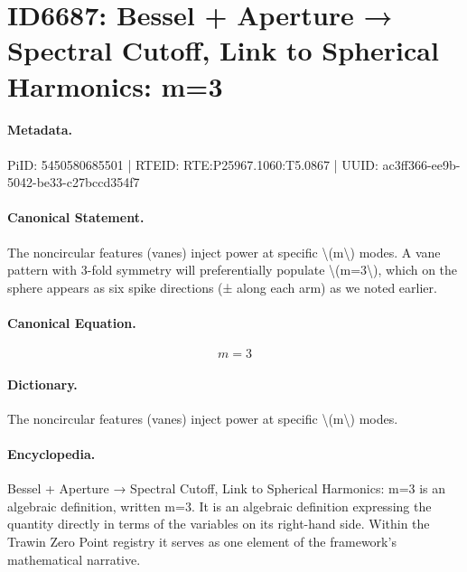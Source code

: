 \section*{ID6687: Bessel + Aperture → Spectral Cutoff, Link to Spherical Harmonics: m=3}
\paragraph{Metadata.}
PiID: 5450580685501 | RTEID: RTE:P25967.1060:T5.0867 | UUID: ac3ff366-ee9b-5042-be33-c27bccd354f7

\paragraph{Canonical Statement.}
The noncircular features (vanes) inject power at specific \textbackslash{}(m\textbackslash{}) modes. A vane pattern with 3-fold symmetry will preferentially populate \textbackslash{}(m=3\textbackslash{}), which on the sphere appears as six spike directions (± along each arm) as we noted earlier.

\paragraph{Canonical Equation.}
\[
m=3
\]

\paragraph{Dictionary.}
The noncircular features (vanes) inject power at specific \textbackslash{}(m\textbackslash{}) modes.

\paragraph{Encyclopedia.}
Bessel + Aperture → Spectral Cutoff, Link to Spherical Harmonics: m=3 is an algebraic definition, written m=3. It is an algebraic definition expressing the quantity directly in terms of the variables on its right-hand side. Within the Trawin Zero Point registry it serves as one element of the framework's mathematical narrative.
